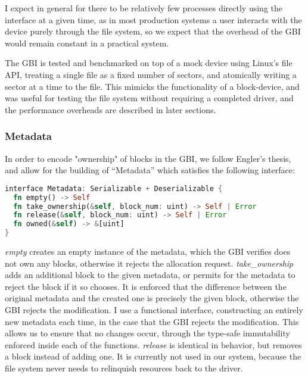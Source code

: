 \documentclass[letterpaper,twocolumn,10pt]{article}
\begin{document}
I expect in general for there to be relatively few processes directly using the interface at a
given time, as in most production systems a user interacts with the device purely through the
file system, so we expect that the overhead of the GBI would remain constant in a practical
system.

The GBI is tested and benchmarked on top of a mock device using Linux's file API, treating a
single file as a fixed number of sectors, and atomically writing a sector at a time to the file.
This mimicks the functionality of a block-device, and was useful for testing the file system
without requiring a completed driver, and the performance overheads are described in later
sections.

\subsubsection{Metadata}

In order to encode "ownership" of blocks in the GBI, we follow Engler's thesis, and allow for
the building of ``Metadata'' which satisfies the following interface:

\begin{lstlisting}[language=rust, basicstyle=\small]
interface Metadata: Serializable + Deserializable {
  fn empty() -> Self
  fn take_ownership(&self, block_num: uint) -> Self | Error
  fn release(&self, block_num: uint) -> Self | Error
  fn owned(&self) -> &[uint]
}
\end{lstlisting}

\textit{empty} creates an empty instance of the metadata, which the GBI verifies does not own
any blocks, otherwise it rejects the allocation request. \textit{take\_ownership} adds an
additional block to the given metadata, or permits for the metadata to reject the block if it so
chooses. It is enforced that the difference between the original metadata and the created one is
precisely the given block, otherwise the GBI rejects the modification. I use a functional
interface, constructing an entirely new metadata each time, in the case that the GBI rejects the
modification. This allows us to ensure that no changes occur, through the type-safe immutability
enforced inside each of the functions. \textit{release} is identical in behavior, but removes a
block instead of adding one. It is currently not used in our system, because the file system
never needs to relinquish resources back to the driver.
\end{document}
